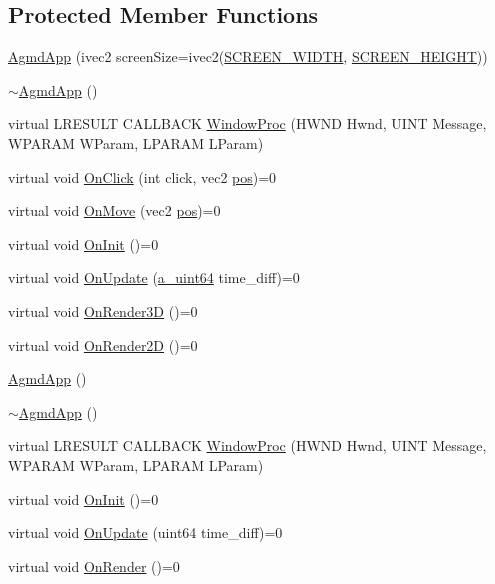 \subsection*{Protected Member Functions}
\begin{DoxyCompactItemize}
\item 
\hyperlink{class_agmd_1_1_agmd_app_adc566113fb7227e4802a448004423a98}{Agmd\+App} (ivec2 screen\+Size=ivec2(\hyperlink{_common_defines_8h_a2cd109632a6dcccaa80b43561b1ab700}{S\+C\+R\+E\+E\+N\+\_\+\+W\+I\+D\+T\+H}, \hyperlink{_common_defines_8h_a6974d08a74da681b3957b2fead2608b8}{S\+C\+R\+E\+E\+N\+\_\+\+H\+E\+I\+G\+H\+T}))
\item 
\hyperlink{class_agmd_1_1_agmd_app_a9d8461bb75c5c38913b0e33a7ed978c8}{$\sim$\+Agmd\+App} ()
\item 
virtual L\+R\+E\+S\+U\+L\+T C\+A\+L\+L\+B\+A\+C\+K \hyperlink{class_agmd_1_1_agmd_app_a498fa9757edacc5ed5efc091ac219b25}{Window\+Proc} (H\+W\+N\+D Hwnd, U\+I\+N\+T Message, W\+P\+A\+R\+A\+M W\+Param, L\+P\+A\+R\+A\+M L\+Param)
\item 
virtual void \hyperlink{class_agmd_1_1_agmd_app_a913ddd866a4970d64cc37305544b84d8}{On\+Click} (int click, vec2 \hyperlink{_examples_2_planet_2_app_8cpp_aa8a1c0491559faca4ebd0881575ae7f0}{pos})=0
\item 
virtual void \hyperlink{class_agmd_1_1_agmd_app_a22c840f51f2aff2962ee8662d6b9755d}{On\+Move} (vec2 \hyperlink{_examples_2_planet_2_app_8cpp_aa8a1c0491559faca4ebd0881575ae7f0}{pos})=0
\item 
virtual void \hyperlink{class_agmd_1_1_agmd_app_ae938cdfcee485e1fb69023ba2f5e48c8}{On\+Init} ()=0
\item 
virtual void \hyperlink{class_agmd_1_1_agmd_app_a836b7ce58f997a907b503ee0d2dca67c}{On\+Update} (\hyperlink{_common_defines_8h_a6c5192ec3c55d6e5b13d2dbaa082bdea}{a\+\_\+uint64} time\+\_\+diff)=0
\item 
virtual void \hyperlink{class_agmd_1_1_agmd_app_a52a150487753d718f1f42e8c1d0b5661}{On\+Render3\+D} ()=0
\item 
virtual void \hyperlink{class_agmd_1_1_agmd_app_a9dd19ef35205d6c1252e5fc00949d5e9}{On\+Render2\+D} ()=0
\item 
\hyperlink{class_agmd_1_1_agmd_app_a5220b0e8bc726ef2c10d3505b0ceb399}{Agmd\+App} ()
\item 
\hyperlink{class_agmd_1_1_agmd_app_a9d8461bb75c5c38913b0e33a7ed978c8}{$\sim$\+Agmd\+App} ()
\item 
virtual L\+R\+E\+S\+U\+L\+T C\+A\+L\+L\+B\+A\+C\+K \hyperlink{class_agmd_1_1_agmd_app_a4dd3f50a00f629880b79e08095a33b1e}{Window\+Proc} (H\+W\+N\+D Hwnd, U\+I\+N\+T Message, W\+P\+A\+R\+A\+M W\+Param, L\+P\+A\+R\+A\+M L\+Param)
\item 
virtual void \hyperlink{class_agmd_1_1_agmd_app_ae938cdfcee485e1fb69023ba2f5e48c8}{On\+Init} ()=0
\item 
virtual void \hyperlink{class_agmd_1_1_agmd_app_a3930b741aeb16f639ecd0c71dea9a205}{On\+Update} (uint64 time\+\_\+diff)=0
\item 
virtual void \hyperlink{class_agmd_1_1_agmd_app_a2bd1821c160b82700acc379b377ef179}{On\+Render} ()=0
\end{DoxyCompactItemize}
